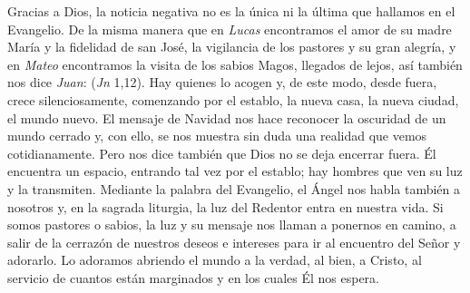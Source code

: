 \begin{body}
	Gracias a Dios, la noticia negativa no es la única ni la última que hallamos en el Evangelio. De la misma manera que en \emph{Lucas} encontramos el amor de su madre María y la fidelidad de san José, la vigilancia de los pastores y su gran alegría, y en \emph{Mateo} encontramos la visita de los sabios Magos, llegados de lejos, así también nos dice \emph{Juan}:  (\emph{Jn} 1,12). Hay quienes lo acogen y, de este modo, desde fuera, crece silenciosamente, comenzando por el establo, la nueva casa, la nueva ciudad, el mundo nuevo. El mensaje de Navidad nos hace reconocer la oscuridad de un mundo cerrado y, con ello, se nos muestra sin duda una realidad que vemos cotidianamente. Pero nos dice también que Dios no se deja encerrar fuera. Él encuentra un espacio, entrando tal vez por el establo; hay hombres que ven su luz y la transmiten. Mediante la palabra del Evangelio, el Ángel nos habla también a nosotros y, en la sagrada liturgia, la luz del Redentor entra en nuestra vida. Si somos pastores o sabios, la luz y su mensaje nos llaman a ponernos en camino, a salir de la cerrazón de nuestros deseos e intereses para ir al encuentro del Señor y adorarlo. Lo adoramos abriendo el mundo a la verdad, al bien, a Cristo, al servicio de cuantos están marginados y en los cuales Él nos espera.
	

\end{body}
